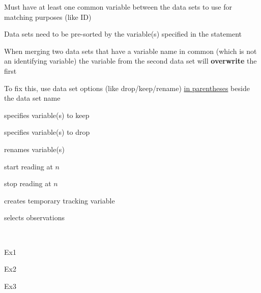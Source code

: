 \begin{frame}[fragile]
\bi
\item Must have at least one common variable between the data sets to use for matching purposes (like ID)
\item Data sets need to be pre-sorted by the variable(s) specified in the  statement
\item When merging two data sets that have a variable name in common (which is not an identifying variable) the variable from the second data set will
\textbf{overwrite} the first
\item To fix this, use data set options (like drop/keep/rename) \underline{in parentheses} beside the data set name
\ei
\end{frame}


\begin{frame}
 \hspace{0.05\in} \emp
{}
\bi
\item[\fbox{\ttt{KEEP =} \emph{variable-list}}] specifies variable(s) to keep
\item[\fbox{\ttt{DROP =} \emph{variable-list}}] specifies variable(s) to drop
\item[\fbox{\ttt{RENAME =} \emph{(oldvar=newvar)}}] renames variable(s)
\item[\fbox{\ttt{FIRSTOBS =} \emph{n}}] start reading at $n$
\item[\fbox{\ttt{OBS =} \emph{n}}] stop reading at $n$
\item[\fbox{\ttt{IN =} \emph{new-var-name}}] creates temporary tracking variable
\item[\fbox{\ttt{WHERE =} \emph{condition}}] selects observations
\item[]
\ei
\emp \\
\hspace*{-0.3in}
\bi
\item[Ex1] 
\item[Ex2] 
\item[Ex3] 
\ei
\end{frame}



